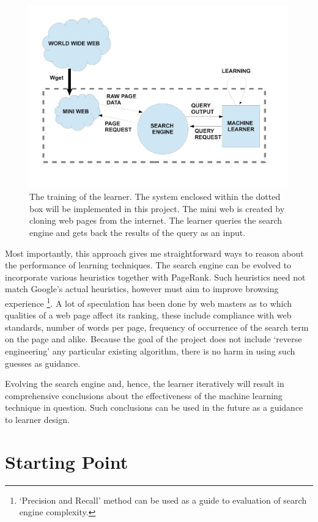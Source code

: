 \begin{figure}
\centering
\includegraphics[scale=0.5]{diagram1}
\caption{The training of the learner. The system enclosed within the dotted box will be implemented in this project. The mini web is created by cloning web pages from the internet. The learner queries the search engine and gets back the results of the query as an input. }
\label{diag1}
\end{figure}

Most importantly, this approach gives me straightforward ways to reason about the performance of learning techniques. The search engine can be evolved to incorporate various heuristics together with PageRank. Such heuristics need not match Google's actual heuristics, however must aim to improve browsing experience \footnote{`Precision and Recall' method can be used as a guide to evaluation of search engine complexity.}. A lot of speculation has been done by web masters as to which qualities of a web page affect its ranking, these include compliance with web standards, number of words per page, frequency of occurrence of the search term on the page and alike. Because the goal of the project does not include `reverse engineering' any particular existing algorithm, there is no harm in using such guesses as guidance. 

Evolving the search engine and, hence, the learner iteratively will result in comprehensive conclusions about the effectiveness of the machine learning technique in question. Such conclusions can be used in the future as a guidance to learner design. 

\section*{\bf Starting Point}

